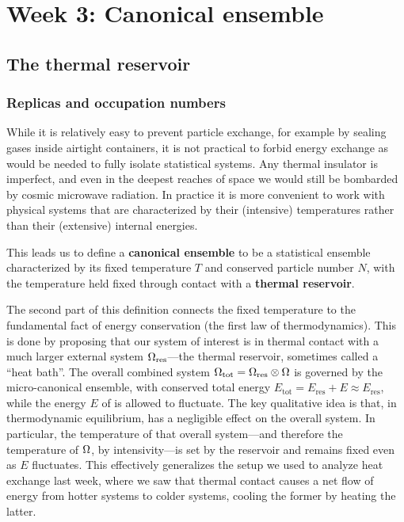 \renewcommand{\thisweek}{MATH327 Week 3}
\renewcommand{\moddate}{Last modified 18 Feb.~2021}
\setcounter{section}{3}
\setcounter{subsection}{0}
{}
\section*{Week 3: Canonical ensemble}
\subsection{The thermal reservoir}
\subsubsection{\label{sec:replicas}Replicas and occupation numbers}
While it is relatively easy to prevent particle exchange, for example by sealing gases inside airtight containers, it is not practical to forbid energy exchange as would be needed to fully isolate statistical systems.
Any thermal insulator is imperfect, and even in the deepest reaches of space we would still be bombarded by cosmic microwave radiation.
In practice it is more convenient to work with physical systems that are characterized by their (intensive) temperatures rather than their (extensive) internal energies.

\begin{shaded}
  This leads us to define a \textbf{canonical ensemble} to be a statistical ensemble characterized by its fixed temperature $T$ and conserved particle number $N$, with the temperature held fixed through contact with a \textbf{thermal reservoir}.
\end{shaded}

The second part of this definition connects the fixed temperature to the fundamental fact of energy conservation (the first law of thermodynamics).
This is done by proposing that our system of interest \Om is in thermal contact with a much larger external system $\Omega_{\text{res}}$---the thermal reservoir, sometimes called a ``heat bath''.
The overall combined system $\Omega_{\text{tot}} = \Omega_{\text{res}} \otimes \Omega$ is governed by the micro-canonical ensemble, with conserved total energy $E_{\text{tot}} = E_{\text{res}} + E \approx E_{\text{res}}$, while the energy $E$ of \Om is allowed to fluctuate.
The key qualitative idea is that, in thermodynamic equilibrium, \Om has a negligible effect on the overall system.
In particular, the temperature of that overall system---and therefore the temperature of $\Omega$, by intensivity---is set by the reservoir and remains fixed even as $E$ fluctuates.
This effectively generalizes the setup we used to analyze heat exchange last week, where we saw that thermal contact causes a net flow of energy from hotter systems to colder systems, cooling the former by heating the latter.

